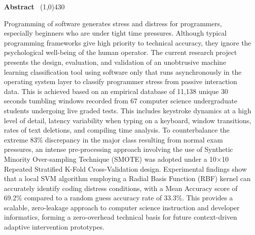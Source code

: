 \setlength{\headheight}{14pt}

\begin{center}
{\huge \bf Abstract} \
\line(1,0){430}
\end{center}

\vspace{1em}

\noindent Programming of software generates stress and distress for programmers, especially beginners who are under tight time pressures. Although typical programming frameworks give high priority to technical accuracy, they ignore the psychological well-being of the human operator. The current research project presents the design, evaluation, and validation of an unobtrusive machine learning classification tool using software only that runs asynchronously in the operating system layer to classify programmer stress from passive interaction data. This is achieved based on an empirical database of 11,138 unique 30 seconds tumbling windows recorded from 67 computer science undergraduate students undergoing live graded tests. This includes keystroke dynamics at a high level of detail, latency variability when typing on a keyboard, window transitions, rates of text deletions, and compiling time analysis. To counterbalance the extreme 83\% discrepancy in the major class resulting from normal exam pressures, an intense pre-processing approach involving the use of Synthetic Minority Over-sampling Technique (SMOTE) was adopted under a 10×10 Repeated Stratified K-Fold Cross-Validation design. Experimental findings show that a local SVM algorithm employing a Radial Basis Function (RBF) kernel can accurately identify coding distress conditions, with a Mean Accuracy score of 69.2\% compared to a random guess accuracy rate of 33.3\%. This provides a scalable, zero-leakage approach to computer science instruction and developer informatics, forming a zero-overhead technical basis for future context-driven adaptive intervention prototypes.


\clearpage
\setlength{\headheight}{12pt}